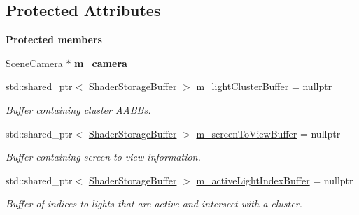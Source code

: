 \subsection*{Protected Attributes}
\begin{Indent}\textbf{ Protected members}\par
\begin{DoxyCompactItemize}
\item 
\mbox{\label{classrev_1_1_light_cluster_grid_a9e732ee3228905528a8a204b8497005f}} 
\mbox{\hyperlink{classrev_1_1_scene_camera}{Scene\+Camera}} $\ast$ {\bfseries m\+\_\+camera}
\item 
\mbox{\label{classrev_1_1_light_cluster_grid_a09dfe93c0e65b80798079d632d2a6a9a}} 
std\+::shared\+\_\+ptr$<$ \mbox{\hyperlink{classrev_1_1_shader_storage_buffer}{Shader\+Storage\+Buffer}} $>$ \mbox{\hyperlink{classrev_1_1_light_cluster_grid_a09dfe93c0e65b80798079d632d2a6a9a}{m\+\_\+light\+Cluster\+Buffer}} = nullptr
\begin{DoxyCompactList}\small\item\em Buffer containing cluster A\+A\+B\+Bs. \end{DoxyCompactList}\item 
\mbox{\label{classrev_1_1_light_cluster_grid_a79c04bb4ab38496e33df0767b51128a1}} 
std\+::shared\+\_\+ptr$<$ \mbox{\hyperlink{classrev_1_1_shader_storage_buffer}{Shader\+Storage\+Buffer}} $>$ \mbox{\hyperlink{classrev_1_1_light_cluster_grid_a79c04bb4ab38496e33df0767b51128a1}{m\+\_\+screen\+To\+View\+Buffer}} = nullptr
\begin{DoxyCompactList}\small\item\em Buffer containing screen-\/to-\/view information. \end{DoxyCompactList}\item 
\mbox{\label{classrev_1_1_light_cluster_grid_af14741b7330c07cc2d38b641b91a7277}} 
std\+::shared\+\_\+ptr$<$ \mbox{\hyperlink{classrev_1_1_shader_storage_buffer}{Shader\+Storage\+Buffer}} $>$ \mbox{\hyperlink{classrev_1_1_light_cluster_grid_af14741b7330c07cc2d38b641b91a7277}{m\+\_\+active\+Light\+Index\+Buffer}} = nullptr
\begin{DoxyCompactList}\small\item\em Buffer of indices to lights that are active and intersect with a cluster. \end{DoxyCompactList}\item 

\end{DoxyCompactItemize}
\end{Indent}
